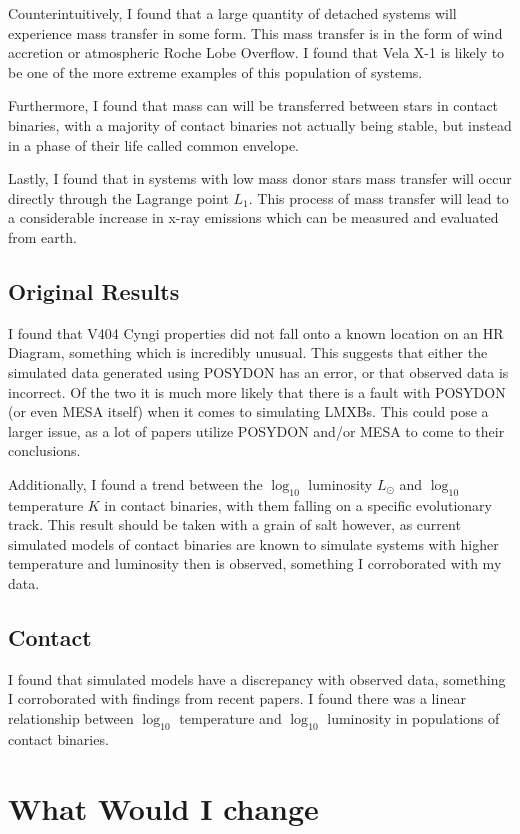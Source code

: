 \documentclass[12pt, a4paper]{article}
\begin{document}
    Counterintuitively, I found that a large quantity of detached systems will experience mass transfer in some form. This mass transfer is in the form of wind accretion or atmospheric Roche Lobe Overflow. I found that Vela X-1 is likely to be one of the more extreme examples of this population of systems.

    Furthermore, I found that mass can will be transferred between stars in contact binaries, with a majority of contact binaries not actually being stable, but instead in a phase of their life called common envelope.

    Lastly, I found that in systems with low mass donor stars mass transfer will occur directly through the Lagrange point $L_1$. This process of mass transfer will lead to a considerable increase in x-ray emissions which can be measured and evaluated from earth.
    
    \subsection{Original Results}
        I found that V404 Cyngi properties did not fall onto a known location on an HR Diagram, something which is incredibly unusual. This suggests that either the simulated data generated using POSYDON has an error, or that observed data is incorrect. Of the two it is much more likely that there is a fault with POSYDON (or even MESA itself) when it comes to simulating LMXBs. This could pose a larger issue, as a lot of papers utilize POSYDON and/or MESA to come to their conclusions. 

        Additionally, I found a trend between the $\log_{10}$ luminosity $L_{\odot}$ and $\log_{10}$ temperature $K$ in contact binaries, with them falling on a specific evolutionary track. This result should be taken with a grain of salt however, as current simulated models of contact binaries are known to simulate systems with higher temperature and luminosity then is observed, something I corroborated with my data.

    
    \subsection{Contact}
    I found that simulated models have a discrepancy with observed data, something I corroborated with findings from recent papers. I found there was a linear relationship between $\log_{10}$ temperature and $\log_{10}$ luminosity in populations of contact binaries.
\section{What Would I change}
\end{document}
